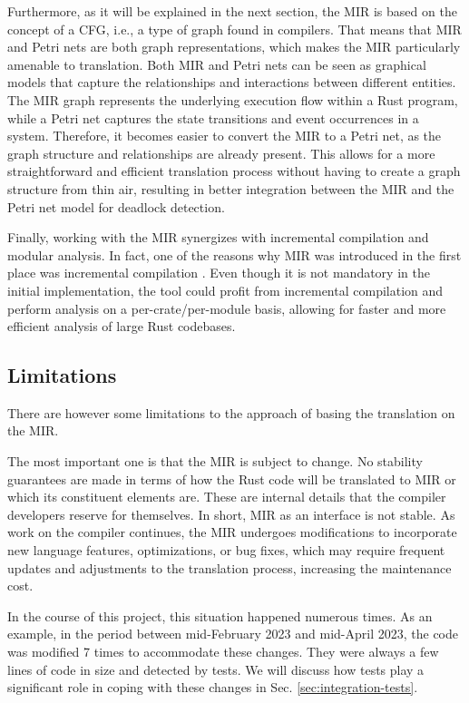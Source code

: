 Furthermore, as it will be explained in the next section, the \acrshort{MIR}
is based on the concept of a \acrfull{CFG}, i.e., a type of graph found in compilers.
That means that \acrshort{MIR} and Petri nets are both graph representations,
which makes the \acrshort{MIR} particularly amenable to translation.
Both \acrshort{MIR} and Petri nets can be seen as graphical models
that capture the relationships and interactions between different entities.
The \acrshort{MIR} graph represents the underlying execution flow within a Rust program,
while a Petri net captures the state transitions and event occurrences in a system.
Therefore, it becomes easier to convert the \acrshort{MIR} to a Petri net,
as the graph structure and relationships are already present.
This allows for a more straightforward and efficient translation process
without having to create a graph structure from thin air,
resulting in better integration between the \acrshort{MIR}
and the Petri net model for deadlock detection.

Finally, working with the \acrshort{MIR} synergizes
with incremental compilation and modular analysis.
In fact, one of the reasons why \acrshort{MIR} was introduced
in the first place was incremental compilation \cite{matsakis2016mir}.
Even though it is not mandatory in the initial implementation,
the tool could profit from incremental compilation
and perform analysis on a per-crate/per-module basis,
allowing for faster and more efficient analysis of large Rust codebases.

\subsection{Limitations}

There are however some limitations to the approach of basing the translation
on the \acrfull{MIR}.

The most important one is that the \acrshort{MIR} is subject to change.
No stability guarantees are made in terms of
how the Rust code will be translated to \acrshort{MIR}
or which its constituent elements are.
These are internal details that the compiler developers reserve for themselves.
In short, \acrshort{MIR} as an interface is not stable.
As work on the compiler continues,
the \acrshort{MIR} undergoes modifications
to incorporate new language features, optimizations, or bug fixes,
which may require frequent updates and adjustments to the translation process,
increasing the maintenance cost.

In the course of this project, this situation happened numerous times.
As an example, in the period between mid-February 2023 and mid-April 2023,
the code was modified 7 times to accommodate these changes.
They were always a few lines of code in size and detected by tests.
We will discuss how tests play a significant role
in coping with these changes in Sec. \ref{sec:integration-tests}.

